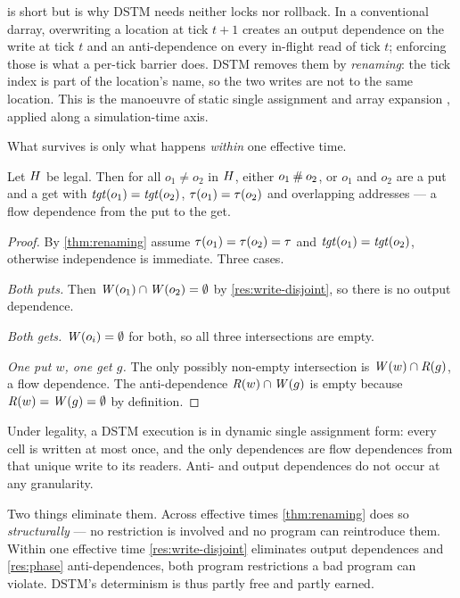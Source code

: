  is short but is why DSTM needs neither locks nor rollback.
In a conventional \gls{darray}, overwriting a location at tick $t+1$ creates
an output dependence on the write at tick $t$ and an anti-dependence on every
in-flight read of tick $t$; enforcing those is what a per-tick \gls{barrier}
does. DSTM removes them by \emph{renaming}: the tick index is part of the
location's name, so the two writes are not to the same location. This is the
manoeuvre of static single assignment \cite{cytron1991ssa} and array expansion
\cite{feautrier1991}, applied along a simulation-time axis.

What survives is only what happens \emph{within} one effective time.

\begin{theorem}\label{thm:residual-dep}
Let $H$ be legal. Then for all $o_1 \ne o_2$ in $H$, either
$o_1 \mathbin{\#} o_2$, or $o_1$ and $o_2$ are a put and a get with
$\mathit{tgt}(o_1) = \mathit{tgt}(o_2)$, $\tau(o_1) = \tau(o_2)$ and overlapping
addresses --- a flow dependence from the put to the get.
\end{theorem}

\begin{proof}
By \cref{thm:renaming} assume $\tau(o_1) = \tau(o_2) = \tau$ and
$\mathit{tgt}(o_1) = \mathit{tgt}(o_2)$, otherwise independence is immediate. Three cases.

\emph{Both \glspl{put}.} Then $\mathit{W}(o_1) \cap \mathit{W}(o_2) = \emptyset$ by
\cref{res:write-disjoint}, so there is no output dependence.

\emph{Both \glspl{get}.} $\mathit{W}(o_i) = \emptyset$ for both, so all three intersections
are empty.

\emph{One put $w$, one get $g$.} The only possibly non-empty intersection is
$\mathit{W}(w) \cap \mathit{R}(g)$, a flow dependence. The anti-dependence
$\mathit{R}(w) \cap \mathit{W}(g)$ is empty because $\mathit{R}(w) = \mathit{W}(g) = \emptyset$ by
definition.
\end{proof}

\begin{corollary}\label{cor:dsa}
Under legality, a DSTM execution is in dynamic single assignment form: every
cell is written at most once, and the only dependences are flow dependences
from that unique write to its readers. Anti- and output dependences do not
occur at any granularity.
\end{corollary}

Two things eliminate them. Across effective times \cref{thm:renaming} does so
\emph{structurally} --- no restriction is involved and no program can
reintroduce them. Within one effective time \cref{res:write-disjoint}
eliminates output dependences and \cref{res:phase} anti-dependences, both
program restrictions a bad program can violate. DSTM's determinism is thus
partly free and partly earned.

